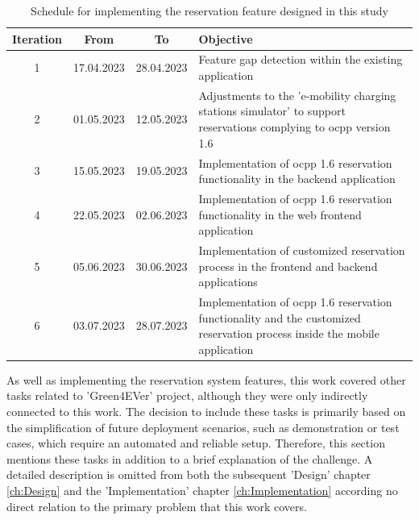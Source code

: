 \begingroup
\setlength{\tabcolsep}{10pt} %
\renewcommand{\arraystretch}{1.5} %
\begin{table}[!ht]
    \centering
    \caption{Schedule for implementing the reservation feature designed in this study}
    \begin{tabular}{c|c|c|m{7cm}}
        Iteration & From & To & Objective \\
        \hline
        1 & 17.04.2023 & 28.04.2023 & Feature gap detection within the existing application \\
        2 & 01.05.2023 & 12.05.2023 & Adjustments to the 'e-mobility charging stations simulator' \cite{noauthor_julianhbuechere-mobility-charging-stations-simulator_nodate} to support reservations complying to \acrshort{ocpp} version 1.6 \\
        3 & 15.05.2023 & 19.05.2023 & Implementation of \acrshort{ocpp} 1.6 reservation functionality in the backend application \\
        4 & 22.05.2023 & 02.06.2023 & Implementation of \acrshort{ocpp} 1.6 reservation functionality in the web frontend application \\
        5 & 05.06.2023 & 30.06.2023 & Implementation of customized reservation process in the frontend and backend applications \\
        6 & 03.07.2023 & 28.07.2023 & Implementation of \acrshort{ocpp} 1.6 reservation functionality and the customized reservation process inside the mobile application \\
    \end{tabular}
    \label{tab:development-iterations}
\end{table}
\endgroup

As well as implementing the reservation system features, this work covered other tasks related to 'Green4EVer' \cite{noauthor_hka_nodate} project, although they were only indirectly connected to this work.
The decision to include these tasks is primarily based on the simplification of future deployment scenarios, such as demonstration or test cases, which require an automated and reliable setup.
Therefore, this section mentions these tasks in addition to a brief explanation of the challenge. A detailed description is omitted from both the subsequent 'Design' chapter \ref{ch:Design} and the 'Implementation' chapter \ref{ch:Implementation} according no direct relation to the primary problem that this work covers.

